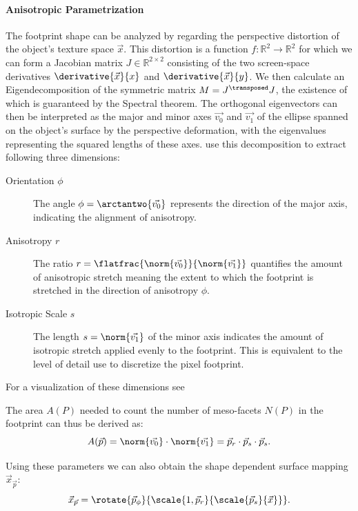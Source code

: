 \paragraph{Anisotropic Parametrization}
%
The footprint shape can be analyzed by regarding the perspective distortion of the object's texture space $\vec{x}$.
%
This distortion is a function $f: \mathbb{R}^2 \to \mathbb{R}^2$ for which we can form a Jacobian matrix $J \in \mathbb{R}^{2 \times 2}$ consisting of the two screen-space derivatives $\derivative{\vec{x}}{x}$ and $\derivative{\vec{x}}{y}$.
%
We then calculate an Eigendecomposition of the symmetric matrix $M=J^\transposed J$, the existence of which is guaranteed by the Spectral theorem.
%
The orthogonal eigenvectors can then be interpreted as the major and minor axes $\vec{v_0}$ and $\vec{v_1}$ of the ellipse spanned on the object's surface by the perspective deformation, with the eigenvalues representing the squared lengths of these axes.
%
\textcite{deliot2023} use this decomposition to extract following three dimensions:
%
\begin{description}
    \item[Orientation $\phi$\label{dim:phi}]
    The angle $\phi=\arctantwo{\vec{v_0}}$ represents the direction of the major axis, indicating the alignment of anisotropy.

    \item[Anisotropy $r$\label{dim:aniso}]
    The ratio $r=\flatfrac{\norm{\vec{v_0}}}{\norm{\vec{v_1}}}$ quantifies the amount of anisotropic stretch meaning the extent to which the footprint is stretched in the direction of anisotropy $\phi$.
    
    \item[Isotropic Scale $s$\label{dim:scale}]
    The length $s=\norm{\vec{v_1}}$ of the minor axis indicates the amount of isotropic stretch applied evenly to the footprint.
    This is equivalent to the level of detail \textcite{zirr2016} use to discretize the pixel footprint.
\end{description}
%
For a visualization of these dimensions see %


The area $A(P)$ needed to count the number of meso-facets $N(P)$ in the footprint can thus be derived as:
%
\begin{equation}
    A(\vec{p})
    = \norm{\vec{v_0}} \cdot \norm{\vec{v_1}}
    = \vec{p}_r \cdot \vec{p}_s \cdot \vec{p}_s.
\end{equation}

Using these parameters we can also obtain the shape dependent surface mapping $\vec{x}_{\vec{p}}$:
%
\begin{equation}
\label{eq:anisotropy-compensation}
    \vec{x}_{\vec{p}}=\rotate{\vec{p}_{\phi}}{\scale{1,\vec{p}_r}{\scale{\vec{p}_s}{\vec{x}}}}.
\end{equation}

